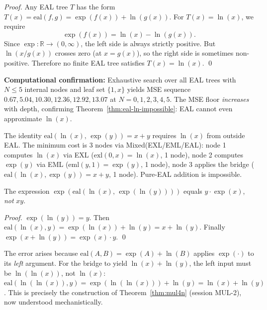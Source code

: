 \begin{proof}
Any EAL tree $T$ has the form $T(x) = \mathrm{eal}(f, g) = \exp(f(x)) + \ln(g(x))$.
For $T(x) = \ln(x)$, we require
\[
  \exp(f(x)) = \ln(x) - \ln(g(x)).
\]
Since $\exp: \mathbb{R} \to (0, \infty)$, the left side is always strictly positive.
But $\ln(x/g(x))$ crosses zero (at $x = g(x)$), so the right side is sometimes
non-positive. Therefore no finite EAL tree satisfies $T(x) = \ln(x)$. \qed
\end{proof}

\textbf{Computational confirmation:} Exhaustive search over all EAL trees with $N \leq 5$
internal nodes and leaf set $\{1, x\}$ yields MSE sequence $0.67, 5.04, 10.30, 12.36,
12.92, 13.07$ at $N = 0, 1, 2, 3, 4, 5$. The MSE floor \emph{increases} with depth,
confirming Theorem~\ref{thm:eal-ln-impossible}: EAL cannot even approximate $\ln(x)$.

\begin{corollary}
The identity $\mathrm{eal}(\ln(x),\, \exp(y)) = x + y$ requires $\ln(x)$ from outside EAL.
The minimum cost is 3 nodes via Mixed(EXL/EML/EAL):
node 1 computes $\ln(x)$ via EXL ($\mathrm{exl}(0,x) = \ln(x)$, 1 node),
node 2 computes $\exp(y)$ via EML ($\mathrm{eml}(y,1) = \exp(y)$, 1 node),
node 3 applies the bridge ($\mathrm{eal}(\ln(x), \exp(y)) = x+y$, 1 node).
Pure-EAL addition is impossible.
\end{corollary}

\begin{proposition}[Incorrect Construction: $\exp(\mathrm{eal}(\ln x,\, \exp\ln y)) = y\exp(x)$]
The expression $\exp(\mathrm{eal}(\ln(x),\, \exp(\ln(y))))$ equals $y \cdot \exp(x)$,
\emph{not} $xy$.
\end{proposition}

\begin{proof}
$\exp(\ln(y)) = y$. Then $\mathrm{eal}(\ln(x), y) = \exp(\ln(x)) + \ln(y) = x + \ln(y)$.
Finally $\exp(x + \ln(y)) = \exp(x) \cdot y$. \qed
\end{proof}

\begin{remark}
The error arises because $\mathrm{eal}(A, B) = \exp(A) + \ln(B)$ applies $\exp(\cdot)$
to its \emph{left} argument. For the bridge to yield $\ln(x) + \ln(y)$, the left input
must be $\ln(\ln(x))$, not $\ln(x)$: $\mathrm{eal}(\ln(\ln(x)), y) = \exp(\ln(\ln(x))) + \ln(y)
= \ln(x) + \ln(y)$. This is precisely the construction of Theorem~\ref{thm:mul4n}
(session MUL-2), now understood mechanistically.
\end{remark}


